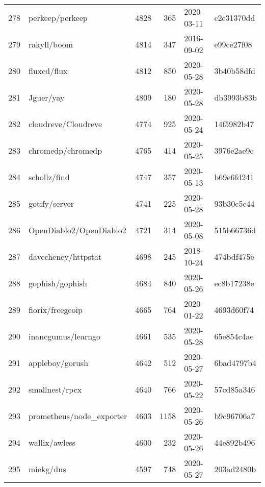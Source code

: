 \begin{longtable}{llrrll}
    278 &                                    perkeep/perkeep &   4828 &    365 & 2020-03-11 &  c2e31370dd \\
    279 &                                        rakyll/boom &   4814 &    347 & 2016-09-02 &  e99ce27f08 \\
    280 &                                        fluxcd/flux &   4812 &    850 & 2020-05-28 &  3b40b58dfd \\
    281 &                                          Jguer/yay &   4809 &    180 & 2020-05-28 &  db3993b83b \\
    282 &                                cloudreve/Cloudreve &   4774 &    925 & 2020-05-24 &  14f5982b47 \\
    283 &                                  chromedp/chromedp &   4765 &    414 & 2020-05-25 &  3976e2ae9c \\
    284 &                                       schollz/find &   4747 &    357 & 2020-05-13 &  b69e6fd241 \\
    285 &                                      gotify/server &   4741 &    225 & 2020-05-28 &  93b30c5c44 \\
    286 &                            OpenDiablo2/OpenDiablo2 &   4721 &    314 & 2020-05-08 &  515b66736d \\
    287 &                                davecheney/httpstat &   4698 &    245 & 2018-10-24 &  474bdf475e \\
    288 &                                    gophish/gophish &   4684 &    840 & 2020-05-26 &  ec8b17238e \\
    289 &                                   fiorix/freegeoip &   4665 &    764 & 2020-01-22 &  4693d60f74 \\
    290 &                                 inancgumus/learngo &   4661 &    535 & 2020-05-28 &  65e854c4ae \\
    291 &                                    appleboy/gorush &   4642 &    512 & 2020-05-27 &  6bad4797b4 \\
    292 &                                     smallnest/rpcx &   4640 &    766 & 2020-05-22 &  57cd85a346 \\
    293 &                           prometheus/node\_exporter &   4603 &   1158 & 2020-05-26 &  b9c96706a7 \\
    294 &                                      wallix/awless &   4600 &    232 & 2020-05-26 &  44e892b496 \\
    295 &                                          miekg/dns &   4597 &    748 & 2020-05-27 &  203ad2480b \\

\end{longtable}
